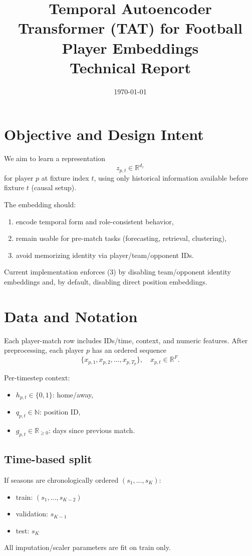 \documentclass[11pt]{article}
\title{Temporal Autoencoder Transformer (TAT) for Football Player Embeddings\\Technical Report}
\author{}
\date{\today}
\begin{document}
\maketitle

\section{Objective and Design Intent}

We aim to learn a representation
\begin{equation}
 z_{p,t} \in \mathbb{R}^{d_z}
\end{equation}
for player $p$ at fixture index $t$, using only historical information available before fixture $t$ (causal setup).

The embedding should:
\begin{enumerate}[label=\arabic*)]
  \item encode temporal form and role-consistent behavior,
  \item remain usable for pre-match tasks (forecasting, retrieval, clustering),
  \item avoid memorizing identity via player/team/opponent IDs.
\end{enumerate}

Current implementation enforces (3) by disabling team/opponent identity embeddings and, by default, disabling direct position embeddings.

\section{Data and Notation}

Each player-match row includes IDs/time, context, and numeric features. After preprocessing, each player $p$ has an ordered sequence
\begin{equation}
\{x_{p,1}, x_{p,2}, \dots, x_{p,T_p}\},\quad x_{p,t}\in\mathbb{R}^{F}.
\end{equation}

Per-timestep context:
\begin{itemize}
  \item $h_{p,t}\in\{0,1\}$: home/away,
  \item $q_{p,t}\in\mathbb{N}$: position ID,
  \item $g_{p,t}\in\mathbb{R}_{\ge 0}$: days since previous match.
\end{itemize}

\subsection{Time-based split}
If seasons are chronologically ordered $(s_1,\dots,s_K)$:
\begin{itemize}
  \item train: $(s_1,\dots,s_{K-2})$
  \item validation: $s_{K-1}$
  \item test: $s_K$
\end{itemize}
All imputation/scaler parameters are fit on train only.
\end{document}
